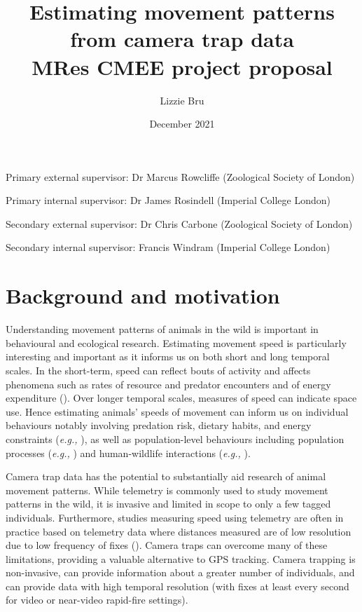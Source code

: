 \documentclass[11pt]{article}
\title{%
	\textbf{Estimating movement patterns from camera trap data} \\
	\large MRes CMEE project proposal}
\author[1]{Lizzie Bru}
\affil[1]{School of Life Sciences, Imperial College London, Silwood Park Campus, Ascot SL5 7PY, UK}
\date{December 2021}
\begin{document}
	
	\maketitle
	
	\begin{center}
		Primary external supervisor: Dr Marcus Rowcliffe (Zoological Society of London)
	\end{center}

	\begin{center}
		Primary internal supervisor: Dr James Rosindell (Imperial College London)
	\end{center}

	\begin{center}
		Secondary external supervisor: Dr Chris Carbone (Zoological Society of London)
	\end{center}
	
	\begin{center}
		Secondary internal supervisor: Francis Windram (Imperial College London)
	\end{center}
	


	
	\newpage
	
	\section{Background and motivation}
	
	Understanding movement patterns of animals in the wild is important in behavioural and ecological research. Estimating movement speed is particularly interesting and important as it informs us on both short and long temporal scales. In the short-term, speed can reflect bouts of activity and affects phenomena such as rates of resource and predator encounters and of energy expenditure (\cite{schmidt1972locomotion, pyke1981optimal}). Over longer temporal scales, measures of speed can indicate space use. Hence estimating animals' speeds of movement can inform us on individual behaviours notably involving predation risk, dietary habits, and energy constraints (\textit{e.g.,} \cite{miller2014amur}), as well as population-level behaviours including population processes (\textit{e.g.,} \cite{werner1993ecological}) and human-wildlife interactions (\textit{e.g.,} \cite{graham2009movement}).
	
	Camera trap data has the potential to substantially aid research of animal movement patterns. While telemetry is commonly used to study movement patterns in the wild, it is invasive and limited in scope to only a few tagged individuals. Furthermore, studies measuring speed using telemetry are often in practice based on telemetry data where distances measured are of low resolution due to low frequency of fixes (\cite{rowcliffe2012bias}). Camera traps can overcome many of these limitations, providing a valuable alternative to GPS tracking. Camera trapping is non-invasive, can provide information about a greater number of individuals, and can provide data with high temporal resolution (with fixes at least every second for video or near-video rapid-fire settings).
	
\end{document}
